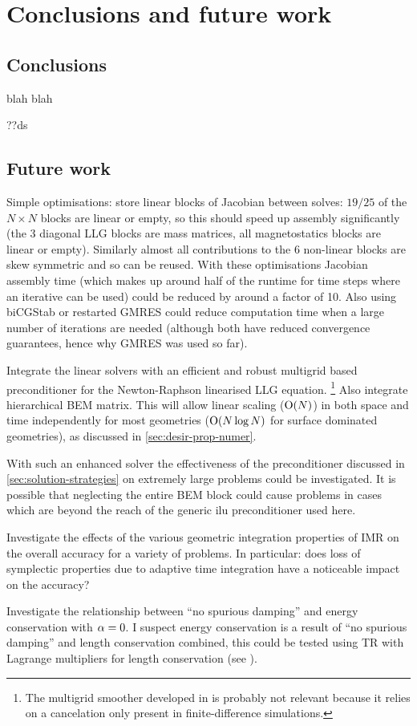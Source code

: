 \chapter{Conclusions and future work}

\section{Conclusions}

blah blah

??ds


\section{Future work}

Simple optimisations: store linear blocks of Jacobian between solves: $19/25$ of the $N \times N$ blocks are linear or empty, so this should speed up assembly significantly (the 3 diagonal LLG blocks are mass matrices, all magnetostatics blocks are linear or empty).
Similarly almost all contributions to the 6 non-linear blocks are skew symmetric and so can be reused.
With these optimisations Jacobian assembly time (which makes up around half of the runtime for time steps where an iterative can be used) could be reduced by around a factor of 10.
Also using biCGStab or restarted GMRES could reduce computation time when a large number of iterations are needed (although both have reduced convergence guarantees, hence why GMRES was used so far).


Integrate the linear solvers with an efficient and robust multigrid based preconditioner for the Newton-Raphson linearised LLG equation. \footnote{The multigrid smoother developed in \cite{Jeong2014} is probably not relevant because it relies on a cancelation only present in finite-difference simulations.}
Also integrate hierarchical BEM matrix.
This will allow linear scaling (\ie $\mathrm{O}{\left( N \right)}$) in both space and time independently for most geometries ($\mathrm{O}{\left( N \log N \right)}$ for surface dominated geometries), as discussed in \cref{sec:desir-prop-numer}.


With such an enhanced solver the effectiveness of the preconditioner discussed in \cref{sec:solution-strategies} on extremely large problems could be investigated.
It is possible that neglecting the entire BEM block could cause problems in cases which are beyond the reach of the generic ilu preconditioner used here.


Investigate the effects of the various geometric integration properties of IMR on the overall accuracy for a variety of problems.
In particular: does loss of symplectic properties due to adaptive time integration have a noticeable impact on the accuracy?


Investigate the relationship between ``no spurious damping'' and energy conservation with $\alpha = 0$.
I suspect energy conservation is a result of ``no spurious damping'' and length conservation combined, this could be tested using TR with Lagrange multipliers for length conservation (see \eg \cite{Szambolics2008a}).


